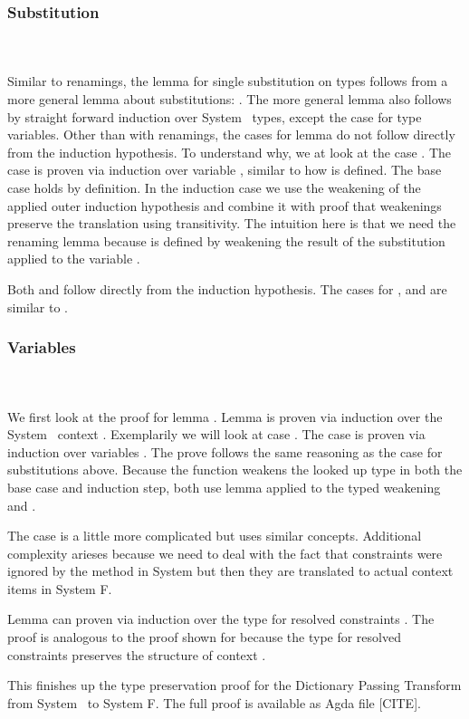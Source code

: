 \subsubsection{Substitution}\hfill\\\\
Similar to renamings, the lemma for single substitution on types  follows from a more general lemma about substitutions: \DPTTypePresSingleSub. 
The more general lemma  also follows by straight forward induction over System \Fo\ types, except the case for type variables. 
Other than with renamings, the cases for lemma  do not follow directly from the induction hypothesis. 
To understand why, we at look at the case .
\DPTVarPresSub
The case  is proven via induction over variable , similar to how  is defined. 
The base case holds by definition. 
In the induction case we use the weakening of the applied outer induction hypothesis and combine it with proof that weakenings preserve the translation using transitivity. 
The intuition here is that we need the renaming lemma  because  is defined by weakening the result of the substitution  applied to the variable .

\noindent Both  and  follow directly from the induction hypothesis. 
The cases for ,  and  are similar to .

\subsubsection{Variables}\hfill\\\\
We first look at the proof for lemma . 
Lemma  is proven via induction over the System \Fo\ context . 
\DPTVarPresLookup
Exemplarily we will look at case   . The case is proven via induction over variables . 
The prove follows the same reasoning as the  case for substitutions above. 
Because the function  weakens the looked up type  in both the base case and induction step, both use lemma  applied to the typed weakening and . 

\noindent The case    is a little more complicated but uses similar concepts.
Additional complexity arieses because we need to deal with the fact that constraints were ignored by the  method in System \Fo but then they are translated to actual context items in System F.

\noindent Lemma  can proven via induction over the type for resolved constraints \Data{[}  \Data{]∈} . 
The proof is analogous to the proof shown for  because the type for resolved constraints preserves the structure of context . 

\noindent This finishes up the type preservation proof for the Dictionary Passing Transform from System \Fo\ to System F. The full proof is available as Agda file [CITE].